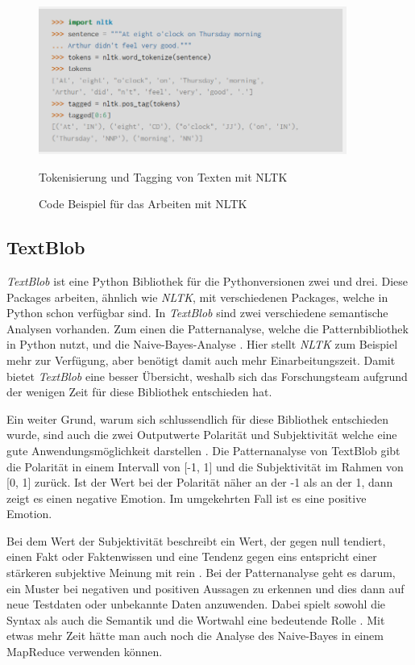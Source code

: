 \begin{figure}[ht]
	\centering
	\includegraphics[width=0.9\textwidth]{images/Kapitel2/Code_Beispiel_2}
		\caption{\label{fig:CodeBeispiel2}Code Beispiel für das Arbeiten mit NLTK}{Tokenisierung und Tagging von Texten mit NLTK}
\end{figure}
	
\subsection{TextBlob}
	
\textit{TextBlob} ist eine Python Bibliothek für die Pythonversionen zwei und drei. Diese Packages arbeiten, ähnlich wie \textit{NLTK}, mit verschiedenen Packages, welche in Python schon verfügbar sind. In \textit{TextBlob} sind zwei verschiedene semantische Analysen vorhanden. Zum einen die Patternanalyse, welche die Patternbibliothek in Python nutzt, und die Naive-Bayes-Analyse . Hier stellt \textit{NLTK} zum Beispiel mehr zur Verfügung, aber benötigt damit auch mehr Einarbeitungszeit. Damit bietet \textit{TextBlob} eine besser Übersicht, weshalb sich das Forschungsteam aufgrund der wenigen Zeit für diese Bibliothek entschieden hat.
	
Ein weiter Grund, warum sich schlussendlich für diese Bibliothek entschieden wurde, sind auch die zwei Outputwerte Polarität und Subjektivität welche eine gute Anwendungsmöglichkeit darstellen . Die Patternanalyse von TextBlob gibt die Polarität in einem Intervall von [-1, 1] und die Subjektivität im Rahmen von [0, 1] zurück. Ist der Wert bei der Polarität näher an der -1 als an der 1, dann zeigt es einen negative Emotion. Im umgekehrten Fall ist es eine positive Emotion.
	
Bei dem Wert der Subjektivität beschreibt ein Wert, der gegen null tendiert, einen Fakt oder Faktenwissen und eine Tendenz gegen eins entspricht einer stärkeren subjektive Meinung mit rein  . Bei der Patternanalyse geht es darum, ein Muster bei negativen und positiven Aussagen zu erkennen und dies dann auf neue Testdaten oder unbekannte Daten anzuwenden. Dabei spielt sowohl die Syntax als auch die Semantik und die Wortwahl eine bedeutende Rolle . Mit etwas mehr Zeit hätte man auch noch die Analyse des Naive-Bayes in einem MapReduce verwenden können.

